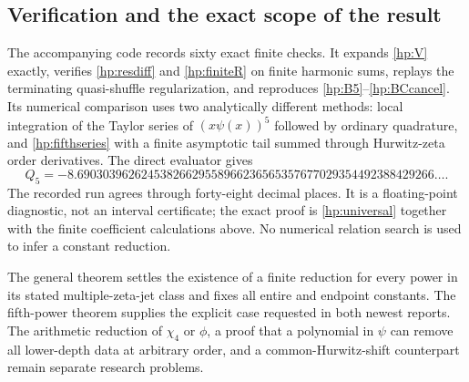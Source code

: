 \subsection{Verification and the exact scope of the result}

The accompanying code records sixty exact finite checks. It expands \eqref{hp:V} exactly, verifies
\eqref{hp:resdiff} and \eqref{hp:finiteR} on finite harmonic sums,
replays the terminating quasi-shuffle regularization, and reproduces
\eqref{hp:B5}--\eqref{hp:BCcancel}. Its numerical comparison uses
two analytically different methods: local integration of the Taylor
series of $(x\psi(x))^5$ followed by ordinary quadrature, and
\eqref{hp:fifthseries} with a finite asymptotic tail summed through
Hurwitz-zeta order derivatives. The direct evaluator gives
\[
 Q_5=-8.69030396262453826629558966236565357677029354492388429266\ldots.
\]
The recorded run agrees through forty-eight decimal places.
It is a floating-point diagnostic, not an interval certificate;
the exact proof is \eqref{hp:universal} together with the finite
coefficient calculations above. No numerical relation search is
used to infer a constant reduction.

The general theorem settles the existence of a finite reduction
for every power in its stated multiple-zeta-jet class and fixes
all entire and endpoint constants. The fifth-power theorem
supplies the explicit case requested in both newest reports.
The arithmetic reduction of $\chi_4$ or $\phi$, a proof that a
polynomial in $\psi$ can remove all lower-depth data at arbitrary
order, and a common-Hurwitz-shift counterpart remain separate
research problems.
